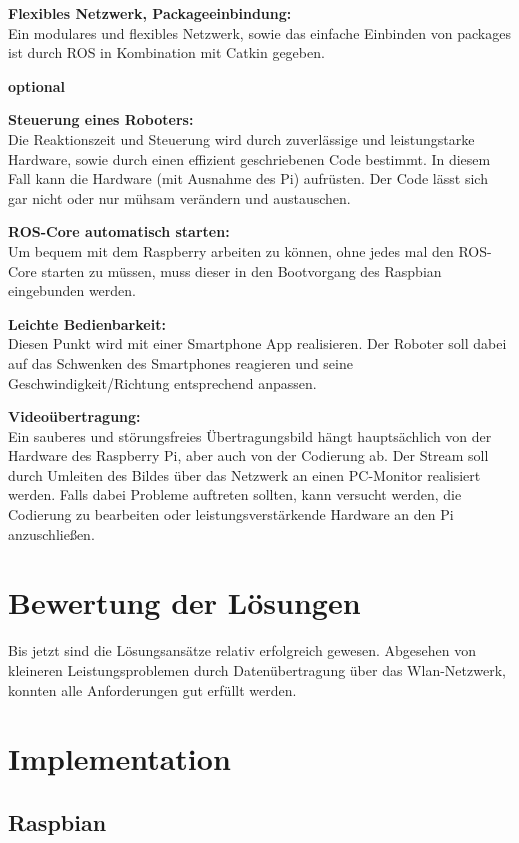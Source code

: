 \documentclass[12pt]{article}
\begin{document}
{\bf Flexibles Netzwerk, Packageeinbindung:}\\
Ein modulares und flexibles Netzwerk, sowie das einfache Einbinden von packages ist durch ROS in Kombination mit Catkin gegeben.

{\bf optional}

{\bf Steuerung eines Roboters:}\\
Die Reaktionszeit und Steuerung wird durch zuverlässige und leistungstarke Hardware, sowie durch einen effizient geschriebenen Code bestimmt. In diesem Fall kann die Hardware (mit Ausnahme des Pi) aufrüsten. Der Code lässt sich gar nicht oder nur mühsam verändern und austauschen.

{\bf ROS-Core automatisch starten:}\\
Um bequem mit dem Raspberry arbeiten zu können, ohne jedes mal den ROS-Core starten zu müssen, muss dieser in den Bootvorgang des Raspbian eingebunden werden.

{\bf Leichte Bedienbarkeit:}\\
Diesen Punkt wird mit einer Smartphone App realisieren. Der Roboter soll dabei auf das Schwenken des Smartphones reagieren und seine Geschwindigkeit/Richtung entsprechend anpassen.

{\bf Videoübertragung:}\\
Ein sauberes und störungsfreies Übertragungsbild hängt hauptsächlich von der Hardware des Raspberry Pi, aber auch von der Codierung ab. Der Stream soll durch  Umleiten des Bildes über das Netzwerk an einen PC-Monitor realisiert werden. Falls dabei Probleme auftreten sollten, kann versucht werden, die Codierung zu bearbeiten oder leistungsverstärkende Hardware an den Pi anzuschließen.

\section{Bewertung der Lösungen}

Bis jetzt sind die Lösungsansätze relativ erfolgreich gewesen. Abgesehen von kleineren Leistungsproblemen durch Datenübertragung über das Wlan-Netzwerk, konnten alle Anforderungen gut erfüllt werden.

\section{Implementation}

\subsection{Raspbian}
\end{document}
